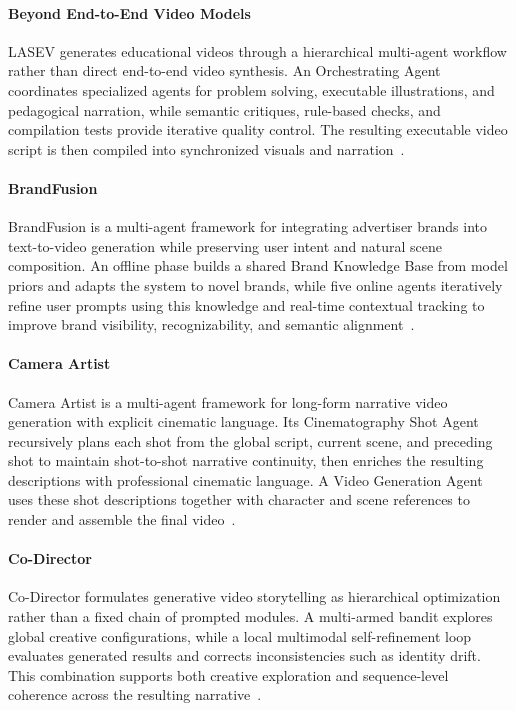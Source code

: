 \paragraph{Beyond End-to-End Video Models}
LASEV generates educational videos through a hierarchical multi-agent workflow rather than direct end-to-end video synthesis. An Orchestrating Agent coordinates specialized agents for problem solving, executable illustrations, and pedagogical narration, while semantic critiques, rule-based checks, and compilation tests provide iterative quality control. The resulting executable video script is then compiled into synchronized visuals and narration~\cite{avg260211790}.

\paragraph{BrandFusion}
BrandFusion is a multi-agent framework for integrating advertiser brands into text-to-video generation while preserving user intent and natural scene composition. An offline phase builds a shared Brand Knowledge Base from model priors and adapts the system to novel brands, while five online agents iteratively refine user prompts using this knowledge and real-time contextual tracking to improve brand visibility, recognizability, and semantic alignment~\cite{avg260302816}.

\paragraph{Camera Artist}
Camera Artist is a multi-agent framework for long-form narrative video generation with explicit cinematic language. Its Cinematography Shot Agent recursively plans each shot from the global script, current scene, and preceding shot to maintain shot-to-shot narrative continuity, then enriches the resulting descriptions with professional cinematic language. A Video Generation Agent uses these shot descriptions together with character and scene references to render and assemble the final video~\cite{avg260409195}.

\paragraph{Co-Director}
Co-Director formulates generative video storytelling as hierarchical optimization rather than a fixed chain of prompted modules. A multi-armed bandit explores global creative configurations, while a local multimodal self-refinement loop evaluates generated results and corrects inconsistencies such as identity drift. This combination supports both creative exploration and sequence-level coherence across the resulting narrative~\cite{avg260424842}.

